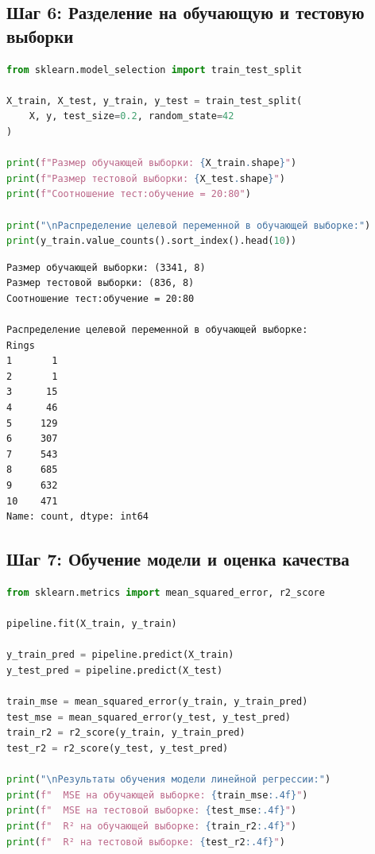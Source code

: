 \subsection{Шаг 6: Разделение на обучающую и тестовую выборки}

\begin{lstlisting}[language=Python, caption=Разделение данных]
from sklearn.model_selection import train_test_split

X_train, X_test, y_train, y_test = train_test_split(
    X, y, test_size=0.2, random_state=42
)

print(f"Размер обучающей выборки: {X_train.shape}")
print(f"Размер тестовой выборки: {X_test.shape}")
print(f"Соотношение тест:обучение = 20:80")

print("\nРаспределение целевой переменной в обучающей выборке:")
print(y_train.value_counts().sort_index().head(10))
\end{lstlisting}

\begin{verbatim}
Размер обучающей выборки: (3341, 8)
Размер тестовой выборки: (836, 8)
Соотношение тест:обучение = 20:80

Распределение целевой переменной в обучающей выборке:
Rings
1       1
2       1
3      15
4      46
5     129
6     307
7     543
8     685
9     632
10    471
Name: count, dtype: int64
\end{verbatim}

\subsection{Шаг 7: Обучение модели и оценка качества}

\begin{lstlisting}[language=Python, caption=Обучение и оценка]
from sklearn.metrics import mean_squared_error, r2_score

pipeline.fit(X_train, y_train)

y_train_pred = pipeline.predict(X_train)
y_test_pred = pipeline.predict(X_test)

train_mse = mean_squared_error(y_train, y_train_pred)
test_mse = mean_squared_error(y_test, y_test_pred)
train_r2 = r2_score(y_train, y_train_pred)
test_r2 = r2_score(y_test, y_test_pred)

print("\nРезультаты обучения модели линейной регрессии:")
print(f"  MSE на обучающей выборке: {train_mse:.4f}")
print(f"  MSE на тестовой выборке: {test_mse:.4f}")
print(f"  R² на обучающей выборке: {train_r2:.4f}")
print(f"  R² на тестовой выборке: {test_r2:.4f}")
\end{lstlisting}

